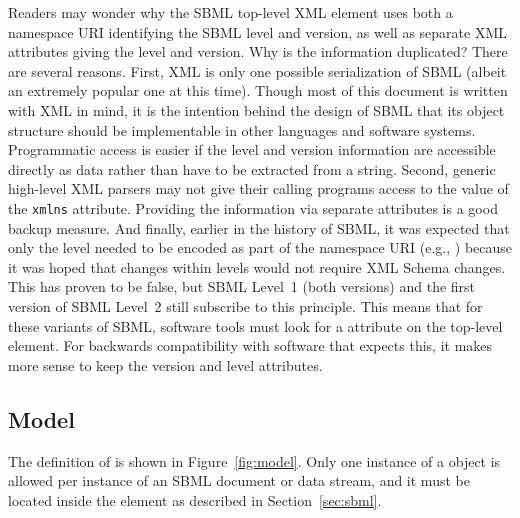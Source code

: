 Readers may wonder why the SBML top-level XML element uses both a
namespace URI identifying the SBML level and version, as well as
separate XML attributes giving the level and version.  Why is the
information duplicated?  There are several reasons.  First, XML is
only one possible serialization of SBML (albeit an extremely
popular one at this time).  Though most of this document is
written with XML in mind, it is the intention behind the design of
SBML that its object structure should be implementable in other
languages and software systems.  Programmatic access is easier if
the level and version information are accessible directly as data
rather than have to be extracted from a string.  Second, generic
high-level XML parsers may not give their calling programs access
to the value of the \texttt{xmlns} attribute.  Providing the
information via separate attributes is a good backup measure.  And
finally, earlier in the history of SBML, it was expected that only
the level needed to be encoded as part of the namespace URI (e.g.,
) because it was hoped that
changes within levels would not require XML Schema changes.  This
has proven to be false, but SBML Level~1 (both versions) and the
first version of SBML Level~2 still subscribe to this principle.
This means that for these variants of SBML, software tools must
look for a  attribute on the top-level element.
For backwards compatibility with software that expects this, it
makes more sense to keep the version and level attributes.


\subsection{Model}
\label{sec:model}

The definition of \Model is shown in Figure~\vref{fig:model}.
Only one instance of a \Model object is allowed per instance of an
SBML \thisLVR document or data stream, and it must be located
inside the  element as described in
Section~\ref{sec:sbml}.

